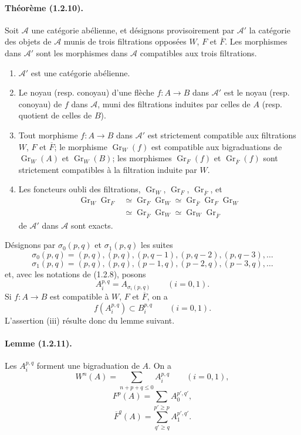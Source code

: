\documentclass[10pt]{article}
\newcommand{\Gr}{\operatorname{Gr}}
\newcommand{\fg}{\guillemotright}
\newcommand{\og}{\guillemotleft}
\newcommand{\calA}{\mathcal A}
\begin{document}
\paragraph{Théorème (1.2.10).} Soit $\calA$ une catégorie abélienne, et désignons provisoirement par $\calA'$ la catégorie des objets de $\calA$ munis de trois filtrations opposées $W$, $F$ et $\overline F$. Les morphismes dans $\calA'$ sont les morphismes dans $\calA$ compatibles aux trois filtrations.
\begin{enumerate}[label=(\roman*)]
\item $\calA'$ est une catégorie abélienne.
\item Le noyau (resp. conoyau) d'une flèche $f:A\to B$ dans $\calA'$ est le noyau (resp. conoyau) de $f$ dans $\calA$, muni des filtrations induites par celles de $A$ (resp. quotient de celles de $B$).
\item Tout morphisme $f:A\to B$ dans $\calA'$ est strictement compatible aux filtrations $W$, $F$ et $\overline F$; le morphisme $\Gr_W(f)$ est compatible aux bigraduations de $\Gr_W(A)$ et $\Gr_W(B)$; les morphismes $\Gr_F(f)$ et $\Gr_{\overline F}(f)$ sont strictement compatibles à la filtration induite par $W$.
\item Les foncteurs \og oubli des filtrations\fg{}, $\Gr_W$, $\Gr_F$, $\Gr_{\overline F}$, et
\[
\begin{aligned}
\Gr_W\Gr_F&\simeq\Gr_F\Gr_W\simeq\Gr_{\overline F}\Gr_F\Gr_W\\
&\simeq\Gr_{\overline F}\Gr_W\simeq\Gr_W\Gr_{\overline F}
\end{aligned}
\]
de $\calA'$ dans $\calA$ sont exacts.
\end{enumerate}

Désignons par $\sigma_0(p,q)$ et $\sigma_1(p,q)$ les suites
\[
\sigma_0(p,q)=(p,q),(p,q),(p,q-1),(p,q-2),(p,q-3),\ldots
\]
\[
\sigma_1(p,q)=(p,q),(p,q),(p-1,q),(p-2,q),(p-3,q),\ldots
\]
et, avec les notations de (1.2.8), posons
\[
A_i^{p,q}=A_{\sigma_i(p,q)}\qquad(i=0,1).
\]
Si $f:A\to B$ est compatible à $W$, $F$ et $\overline F$, on a
\[
\tag{1.2.10.1}
f(A_i^{p,q})\subset B_i^{p,q}\qquad(i=0,1).
\]
L'assertion (iii) résulte donc du lemme suivant.

\paragraph{Lemme (1.2.11).} Les $A_i^{p,q}$ forment une bigraduation de $A$. On a
\[
\tag{1.2.11.1}
W^n(A)=\sum_{n+p+q\le0} A_i^{p,q}\qquad(i=0,1),
\]
\[
\tag{1.2.11.2}
F^p(A)=\sum_{p'\ge p} A_0^{p',q'},
\]
\[
\tag{1.2.11.3}
\overline F^q(A)=\sum_{q'\ge q} A_1^{p',q'}.
\]
\end{document}
